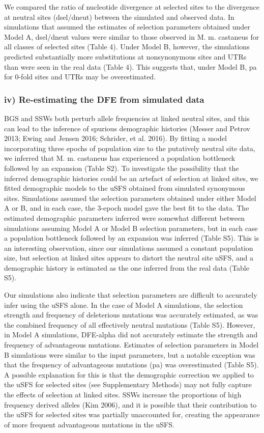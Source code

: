 We compared the ratio of nucleotide divergence at selected sites to the divergence at neutral sites (dsel/dneut) between the simulated and observed data. In simulations that assumed the estimates of selection parameters obtained under Model A, dsel/dneut values were similar to those observed in M. m. castaneus for all classes of selected sites (Table 4). Under Model B, however, the simulations predicted substantially more substitutions at nonsynonymous sites and UTRs than were seen in the real data (Table 4). This suggests that, under Model B, pa for 0-fold sites and UTRs may be overestimated.

\subsubsection{iv) Re-estimating the DFE from simulated data}

	BGS and SSWs both perturb allele frequencies at linked neutral sites, and this can lead to the inference of spurious demographic histories (Messer and Petrov 2013; Ewing and Jensen 2016; Schrider, et al. 2016). By fitting a model incorporating three epochs of population size to the putatively neutral site data, we inferred that M. m. castaneus has experienced a population bottleneck followed by an expansion (Table S2). To investigate the possibility that the inferred demographic histories could be an artefact of selection at linked sites, we fitted demographic models to the uSFS obtained from simulated synonymous sites. Simulations assumed the selection parameters obtained under either Model A or B, and in each case, the 3-epoch model gave the best fit to the data. The estimated demographic parameters inferred were somewhat different between simulations assuming Model A or Model B selection parameters, but in each case a population bottleneck followed by an expansion was inferred (Table S5). This is an interesting observation, since our simulations assumed a constant population size, but selection at linked sites appears to distort the neutral site uSFS, and a demographic history is estimated as the one inferred from the real data (Table S5).

Our simulations also indicate that selection parameters are difficult to accurately infer using the uSFS alone. In the case of Model A simulations, the selection strength and frequency of deleterious mutations was accurately estimated, as was the combined frequency of all effectively neutral mutations (Table S5). However, in Model A simulations, DFE-alpha did not accurately estimate the strength and frequency of advantageous mutations. Estimates of selection parameters in Model B simulations were similar to the input parameters, but a notable exception was that the frequency of advantageous mutations (pa) was overestimated (Table S5). A possible explanation for this is that the demographic correction we applied to the uSFS for selected sites (see Supplementary Methods) may not fully capture the effects of selection at linked sites. SSWs increase the proportions of high frequency derived alleles (Kim 2006), and it is possible that their contribution to the uSFS for selected sites was partially unaccounted for, creating the appearance of more frequent advantageous mutations in the uSFS. 

